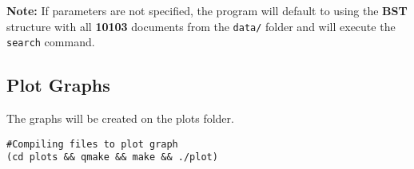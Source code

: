 \textbf{Note:} If parameters are not specified, the program will default to using the \textbf{BST} structure with all \textbf{10103} documents from the \texttt{data/} folder and will execute the \texttt{search} command.

\subsection{Plot Graphs}


The graphs will be created on the plots folder.

    \begin{verbatim}
#Compiling files to plot graph
(cd plots && qmake && make && ./plot)
    \end{verbatim}

